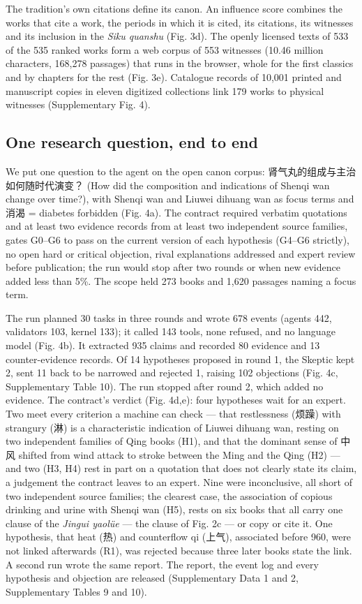 \documentclass[
]{article}
\begin{document}
The tradition's own citations define its canon. An influence score
combines the works that cite a work, the periods in which it is cited,
its citations, its witnesses and its inclusion in the \emph{Siku
quanshu} (Fig. 3d). The openly licensed texts of 533 of the 535 ranked
works form a web corpus of 553 witnesses (10.46 million characters,
168,278 passages) that runs in the browser, whole for the first classics
and by chapters for the rest (Fig. 3e). Catalogue records of 10,001
printed and manuscript copies in eleven digitized collections link 179
works to physical witnesses (Supplementary Fig. 4).

\hypertarget{one-research-question-end-to-end}{%
\subsection{One research question, end to
end}\label{one-research-question-end-to-end}}

We put one question to the agent on the open canon corpus:
肾气丸的组成与主治如何随时代演变？ (How did the composition and
indications of Shenqi wan change over time?), with Shenqi wan and Liuwei
dihuang wan as focus terms and 消渴 = diabetes forbidden (Fig. 4a). The
contract required verbatim quotations and at least two evidence records
from at least two independent source families, gates G0--G6 to pass on
the current version of each hypothesis (G4--G6 strictly), no open hard
or critical objection, rival explanations addressed and expert review
before publication; the run would stop after two rounds or when new
evidence added less than 5\%. The scope held 273 books and 1,620
passages naming a focus term.

The run planned 30 tasks in three rounds and wrote 678 events (agents
442, validators 103, kernel 133); it called 143 tools, none refused, and
no language model (Fig. 4b). It extracted 935 claims and recorded 80
evidence and 13 counter-evidence records. Of 14 hypotheses proposed in
round 1, the Skeptic kept 2, sent 11 back to be narrowed and rejected 1,
raising 102 objections (Fig. 4c, Supplementary Table 10). The run
stopped after round 2, which added no evidence. The contract's verdict
(Fig. 4d,e): four hypotheses wait for an expert. Two meet every
criterion a machine can check --- that restlessness (烦躁) with
strangury (淋) is a characteristic indication of Liuwei dihuang wan,
resting on two independent families of Qing books (H1), and that the
dominant sense of 中风 shifted from wind attack to stroke between the
Ming and the Qing (H2) --- and two (H3, H4) rest in part on a quotation
that does not clearly state its claim, a judgement the contract leaves
to an expert. Nine were inconclusive, all short of two independent
source families; the clearest case, the association of copious drinking
and urine with Shenqi wan (H5), rests on six books that all carry one
clause of the \emph{Jingui yaolüe} --- the clause of Fig. 2c --- or copy
or cite it. One hypothesis, that heat (热) and counterflow qi (上气),
associated before 960, were not linked afterwards (R1), was rejected
because three later books state the link. A second run wrote the same
report. The report, the event log and every hypothesis and objection are
released (Supplementary Data 1 and 2, Supplementary Tables 9 and 10).
\end{document}
